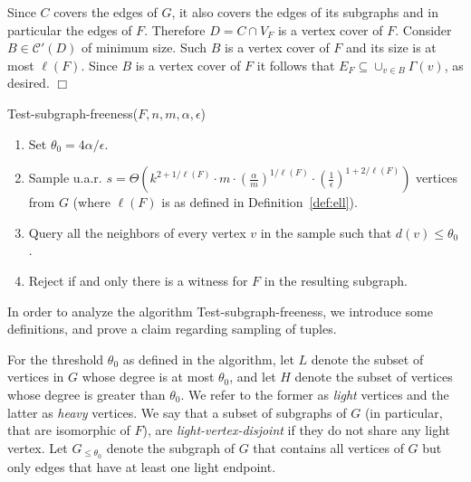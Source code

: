 \documentclass{article}
\newenvironment{proof}{\smallskip\noindent{\bf Proof:}}%
        {\hspace*{\fill}$\Box$\par}
\newcommand{\commentt}[1]{ {}}
\begin{document}
\begin{proof}
Since $C$ covers the edges of $G$, it also covers the edges of its subgraphs and in particular the edges of $F$. Therefore $D = C\cap V_F$ is a vertex cover of $F$. Consider $B\in \mathcal{C'}(D)$ of minimum size. Such $B$ is a vertex cover of $F$ and its size is at most $\ell(F)$.
Since $B$ is a vertex cover of $F$ it follows that $E_F \subseteq \cup_{v\in B} \Gamma(v)$, as desired.
\end{proof}


\commentt{shouldn't the algorithms have different names? Or actually, are we keeping only the first one? And if so, are some of the claims later on redundant?}

\commentt{Also, to be consistent with previous parts, I suggest to replace $t$ with $\theta_0$. Also, there is the notion here of light vertices which is only explained later }

\commentt{I wonder how much effort we should put into trying to make things consist with the previous sections}

\commentt{The issue of getting $m$ as input should be discussed somewhere.}
\fi



\medskip
    \textsf{Test-subgraph-freeness}($F,n, m, \alpha, \epsilon$)\label{alg:Ffree}
\begin{enumerate}
\item Set $\theta_0 = 4\alpha/\epsilon$.
\item Sample u.a.r. $s = $$\Theta\left(k^{2+1/\ell(F)} \cdot m \cdot \left(\frac{\alpha}{m }\right)^{1/\ell(F)} \cdot \left(\frac{1}{\epsilon}\right)^{1+2/\ell(F)}\right)$ vertices from $G$ (where $\ell(F)$ is as defined in Definition~\ref{def:ell}).
\item Query all the neighbors of every vertex $v$ in the sample such that $d(v) \leq \theta_0$ .
\item Reject if and only there is a witness for $F$ in the resulting subgraph.
\end{enumerate}

\medskip
In order to analyze the algorithm Test-subgraph-freeness, we introduce some definitions, and 
prove a claim regarding sampling of tuples.

For the threshold $\theta_0$ as defined in the algorithm, let $L$ denote the subset of vertices in $G$ whose degree is at most $\theta_0$, and let $H$ denote the subset of vertices whose degree is greater than $\theta_0$. 
We refer to the former as \emph{light} vertices and the latter as \emph{heavy} vertices. 
We say that a subset of subgraphs of $G$ (in particular, that are isomorphic of $F$), are 
{\em light-vertex-disjoint} if they do not share any light vertex.
Let $G_{\leq \theta_0}$ denote the subgraph of $G$ that contains all vertices of $G$ but only edges that have at least one light endpoint.
\end{document}
